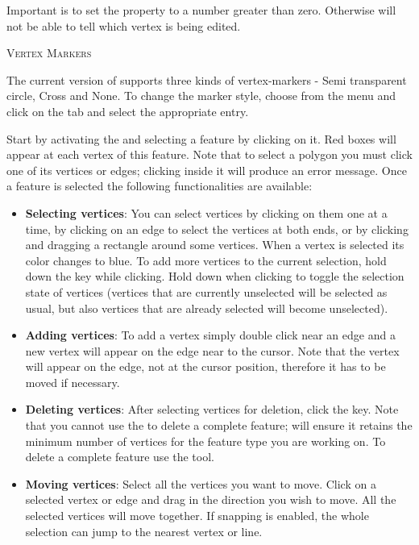 Important is to set the property  \arrow
{} \arrow
{} \arrow {} to a number greater than
zero. Otherwise \qg will not be able to tell which vertex is being edited.

\begin{Tip}\caption{\textsc{Vertex Markers}}
The current version of \qg supports three kinds of vertex-markers -
Semi transparent circle, Cross and None. To change the marker style, choose
 from the  menu
and click on the  tab and select the appropriate entry.
\end{Tip}


Start by activating the  and selecting
a feature by clicking on it. Red boxes will appear at each vertex of this feature.
Note that to select a polygon you must click one of its vertices or edges;
clicking inside it will produce an error message. Once a feature
is selected the following functionalities are available:

\begin{itemize}[label=--]
\item \textbf{Selecting vertices}: You can select vertices by clicking on them
one at a time, by clicking on an edge to select the vertices at both ends, or
by clicking and dragging a rectangle around some vertices.  When a vertex is
selected its color changes to blue. To add more vertices to the current selection,
hold down the  key while clicking. Hold down
 when clicking to toggle the selection state of
vertices (vertices that are currently unselected will be selected as usual, but
also vertices that are already selected will become unselected).
\item \textbf{Adding vertices}: To add a vertex simply double click near
an edge and a new vertex will appear on the edge near to the cursor. Note that
the vertex will appear on the edge, not at the cursor position, therefore it has
to be moved if necessary.
\item \textbf{Deleting vertices}: After selecting vertices for deletion, click the
 key. Note that you cannot use the
 to delete a complete feature; \qg will
ensure it retains the minimum number of vertices for the feature type you are
working on. To delete a complete feature use the
 tool.
\item \textbf{Moving vertices}: Select all the vertices you want to move. Click
on a selected vertex or edge and drag in the direction you wish to move. All the
selected vertices will move together. If snapping is enabled,
the whole selection can jump to the nearest vertex or line.
\end{itemize}

